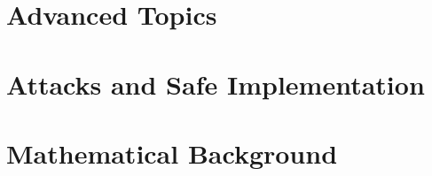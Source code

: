 \documentclass[11pt]{book}
\begin{document}
\part{Advanced Topics}







\part{Attacks and Safe Implementation}




\part{Mathematical Background}


\end{document}
